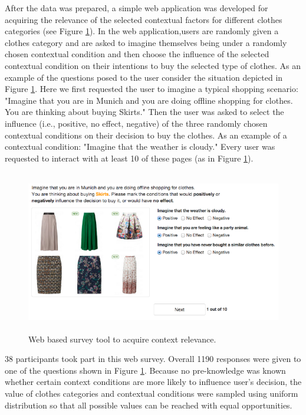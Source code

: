 After the data was prepared, a simple web application was developed for acquiring the relevance of the selected contextual factors for different clothes categories (see Figure \ref{fig:webtool}). In the web application,users are randomly given a clothes category and are asked to imagine themselves being under a randomly chosen contextual condition and then choose the influence of the selected contextual condition on their intentions to buy the selected type of clothes. As an example of the questions posed to the user consider the situation depicted in Figure \ref{fig:webtool}. Here we first requested the user to imagine a typical shopping scenario: "Imagine that you are in Munich and you are doing offline shopping for clothes. You are thinking about buying Skirts." Then the user was asked to select the influence (i.e., positive, no effect, negative) of the three randomly chosen contextual conditions on their decision to buy the clothes. As an example of a contextual condition: "Imagine that the weather is cloudy." Every user was requested to interact with at least 10 of these pages (as in Figure \ref{fig:webtool}). 

\begin{figure}[H]
	\centering
	\includegraphics[height=2.8in]{figures/webtool.png}
	\caption{Web based survey tool to acquire context relevance.}
	\label{fig:webtool}
\end{figure}



38 participants took part in this web survey. Overall 1190 responses were given to one of the questions shown in Figure \ref{fig:webtool}. Because no pre-knowledge was known whether certain context conditions are more likely to influence user's decision, the value of clothes categories and contextual conditions were sampled using uniform distribution so that all possible values can be reached with equal opportunities.

